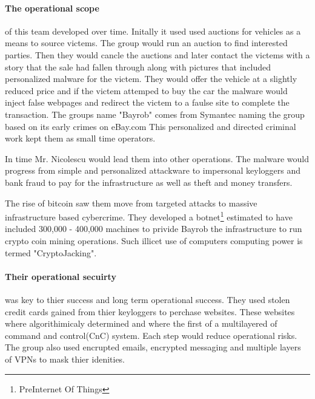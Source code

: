 \documentclass[fleqn,12pt]{SelfArx} %
\begin{document}
\paragraph{The operational scope} of this team developed over time.  Initally it used used auctions for vehicles as a means to source victems.  The group would run an auction to find interested parties.  Then they would cancle the auctions and later contact the victems with a story that the sale had fallen through along with pictures that included personalized malware for the victem.  They would offer the vehicle at a slightly reduced price and if the victem attemped to buy the car the malware would inject false webpages and redirect the victem to a faulse site to complete the transaction.  The groups name "Bayrob" comes from Symantec naming the group based on its early crimes on eBay.com\cite{Cimpanu:ZD:Bayrob}  This personalized and directed criminal work kept them as small time operators.

In time Mr. Nicolescu would lead them into other operations.  The malware would progress from simple and personalized attackware to impersonal keyloggers and bank fraud to pay for the infrastructure as well as theft and money transfers.  

The rise of bitcoin saw them move from targeted attacks to massive infrastructure based cybercrime. They developed a botnet\footnote{PreInternet Of Things} estimated to have included 300,000 - 400,000 machines to privide Bayrob the infrastructure to run crypto coin mining operations.  Such illicet use of computers computing power is termed "CryptoJacking".
 
\paragraph{Their operational secuirty} was key to thier success and long term operational success.  They used stolen credit cards gained from thier keyloggers to perchase websites.  These websites where algorithimicaly determined and where the first of a multilayered of command and control(CnC) system. Each step would reduce operational risks.\cite{Monte:NAaEFrame} The group also used encrupted emails, encrypted messaging and multiple layers of VPNs to mask thier idenities.  
    
  

\end{document}
